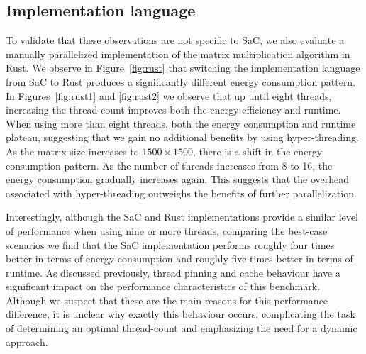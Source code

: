 \subsection{Implementation language}
To validate that these observations are not specific to SaC, we also evaluate a manually
parallelized implementation of the matrix multiplication algorithm in Rust. We observe in
Figure~\ref{fig:rust} that switching the implementation language from SaC to Rust produces a
significantly different energy consumption pattern. In Figures~\ref{fig:rust1} and \ref{fig:rust2}
we observe that up until eight threads, increasing the thread-count improves both the
energy-efficiency and runtime. When using more than eight threads, both the energy consumption and
runtime plateau, suggesting that we gain no additional benefits by using hyper-threading. As the
matrix size increases to $1500 \times 1500$, there is a shift in the energy consumption pattern. As
the number of threads increases from 8 to 16, the energy consumption gradually increases again. This
suggests that the overhead associated with hyper-threading outweighs the benefits of further
parallelization.

Interestingly, although the SaC and Rust implementations provide a similar level of performance
when using nine or more threads, comparing the best-case scenarios we find that the SaC
implementation performs roughly four times better in terms of energy consumption and roughly five
times better in terms of runtime. As discussed previously, thread pinning and cache behaviour have a
significant impact on the performance characteristics of this benchmark. Although we suspect that
these are the main reasons for this performance difference, it is unclear why exactly this behaviour
occurs, complicating the task of determining an optimal thread-count and emphasizing the need for a
dynamic approach.
